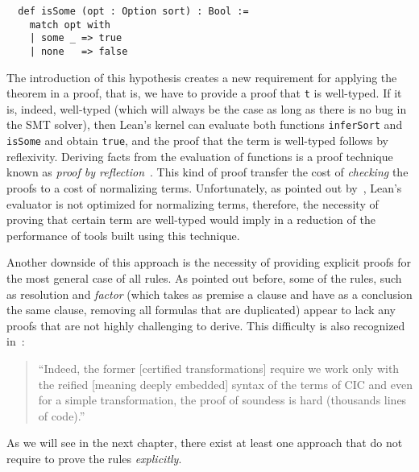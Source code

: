 \begin{verbatim}
  def isSome (opt : Option sort) : Bool :=
    match opt with
    | some _ => true
    | none   => false
\end{verbatim}

The introduction of this hypothesis creates a new requirement for applying
the theorem in a proof, that is, we have to provide a proof that \texttt{t} is well-typed.
If it is, indeed, well-typed (which will always be the case as long
as there is no bug in the SMT solver), then Lean's kernel can evaluate
both functions \texttt{inferSort} and \texttt{isSome} and obtain \texttt{true},
and the proof that the term is well-typed follows by reflexivity. Deriving facts
from the evaluation of functions is a proof technique known as \textit{proof by reflection}~\cite{reflProof}.
This kind of proof transfer the cost of \textit{checking} the proofs to a cost of
normalizing terms. Unfortunately, as pointed out by~\cite{ringLean}, Lean's evaluator
is not optimized for normalizing terms, therefore, the necessity of proving that
certain term are well-typed would imply in a reduction of the performance of
tools built using this technique.

Another downside of this approach is the necessity of providing explicit proofs for the most
general case of all rules. As pointed out before, some of the rules, such as resolution and
\textit{factor} (which takes as premise a clause and have as a conclusion the same clause, removing
all formulas that are duplicated) appear to lack any proofs that are not highly challenging to derive.
This difficulty is also recognized in~\cite[p. 6]{snipe}:
\begin{quote}
  ``Indeed, the former [certified transformations] require we work only with the reified [meaning deeply embedded] syntax of the
  terms of CIC and even for a simple transformation, the proof of soundess is hard (thousands lines of code).''
\end{quote}

As we will see in the next chapter, there exist at least one approach that do not require to prove the rules \textit{explicitly}.




